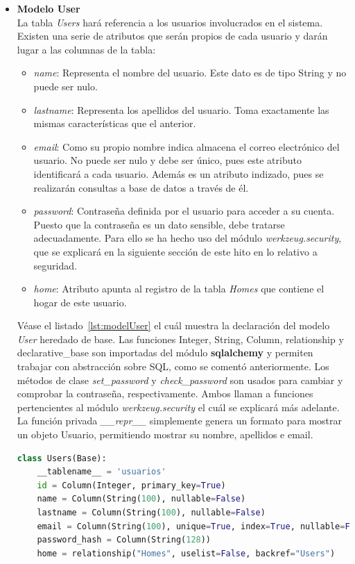 \begin{itemize}
\item \textbf{Modelo User}\\
La tabla \textit{Users} hará referencia a los usuarios involucrados en el sistema. Existen una serie de atributos que serán propios de cada usuario y darán lugar a las columnas de la tabla:
\begin{itemize}
\item \textit{name}: Representa el nombre del usuario. Este dato es de tipo String y no puede ser nulo.
\item \textit{lastname}: Representa los apellidos del usuario. Toma exactamente las mismas características que el anterior.
\item \textit{email}: Como su propio nombre indica almacena el correo electrónico del usuario. No puede ser nulo y debe ser único, pues este atributo identificará a cada usuario. Además es un atributo indizado, pues se realizarán consultas a base de datos a través de él.
\item \textit{password}: Contraseña definida por el usuario para acceder a su cuenta. Puesto que la contraseña es un dato sensible, debe tratarse adecuadamente. Para ello se ha hecho uso del módulo \textit{werkzeug.security}, que se explicará en la siguiente sección de este hito en lo relativo a seguridad.
\item \textit{home}: Atributo apunta al registro de la tabla \textit{Homes} que contiene el hogar de este usuario.
\end{itemize}
Véase el listado~\ref{lst:modelUser} el cuál muestra la declaración del modelo \textit{User} heredado de base. Las funciones Integer, String, Column, relationship y declarative\_base son importadas del módulo \textbf{sqlalchemy} y permiten trabajar con abstracción sobre SQL, como se comentó anteriormente. Los métodos de clase \textit{set\_password} y \textit{check\_password} son usados para cambiar y comprobar la contraseña, respectivamente. Ambos llaman a funciones pertencientes al módulo \textit{werkzeug.security} el cuál se explicará más adelante. La función privada \textit{\_\_repr\_\_} simplemente genera un formato para mostrar un objeto Usuario, permitiendo mostrar su nombre, apellidos e email.
\begin{lstlisting}[language=Python,float=ht,caption={Modelo \textit{User}},label={lst:modelUser}]
class Users(Base):
    __tablename__ = 'usuarios'
    id = Column(Integer, primary_key=True)
    name = Column(String(100), nullable=False)
    lastname = Column(String(100), nullable=False)
    email = Column(String(100), unique=True, index=True, nullable=False)
    password_hash = Column(String(128))
    home = relationship("Homes", uselist=False, backref="Users")


\end{lstlisting}
\end{itemize}

